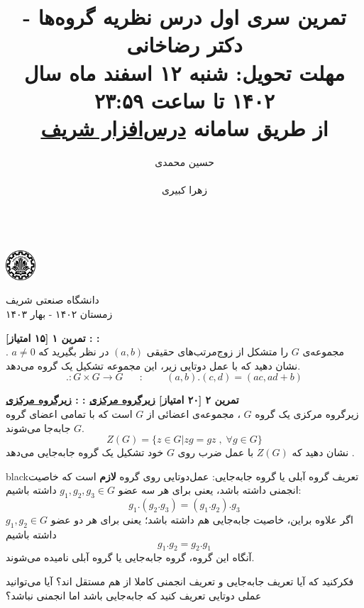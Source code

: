 \documentclass{article}
\title{
	\vspace{-0.8em}
تمرین سری اول درس نظریه گروه‌ها - دکتر رضاخانی
\\
{\normalsize
\textbf{مهلت تحویل:
شنبه ۱۲ اسفند ماه سال ۱۴۰۲ تا ساعت ۲۳:۵۹ 
\\
\vspace{-0.4em}
از طریق سامانه
\href{https://cw.sharif.edu/}{درس‌افزار شریف}
}
}
\vspace{-0.6em}
}
\author{
حسین محمدی\\
  \lr{
  		\href{mailto:hossein.mohammadi.00427@gmail.com}{\texttt{	hossein.mohammadi.00427@gmail.com}}} \\
  \And
  زهرا کبیری\\
 \lr{
  		\href{mailto:kabiri.zahra98@gmail.com}{ \texttt{kabiri.zahra98@gmail.com}}}\\
  }
\newenvironment{exercise}[3][\unskip]{%
	\par
	\noindent
	\textbf{تمرین
		#1
		[#2 امتیاز] 
		\def\temp{#3}\ifx\temp\empty
		: 
		\else
		: #3 \vspace{0.5em} \\ \noindent
		\fi
}}{}
\begin{document}
\begin{minipage}{0.1\textwidth}%
\includegraphics[width=1.1cm]{sharif-logo.png}
\end{minipage}%
\hfill%
\begin{minipage}{0.9\textwidth}\raggedleft
دانشگاه صنعتی شریف\\
زمستان ۱۴۰۲ - بهار ۱۴۰۳\\
\end{minipage}

\makepertitle





\begin{exercise}[۱]{۱۵}{}
	مجموعه‌ی 
	$G$ 
	را متشکل از زوج‌مرتب‌های حقیقی 
	$(a,b)$
	در نظر بگیرید که 
	$a\neq 0$
.
نشان دهید که با عمل دوتایی زیر، این مجموعه تشکیل یک گروه می‌دهد.
\[
. : G \times G \to  G \;\;\;\;\;\;:\;\;\;\;\;\;\;\;
(a,b).(c,d) = (ac,ad+b)
\]
\end{exercise}



\begin{exercise}[۲]{۲۰}{\href{https://en.wikipedia.org/wiki/Central_subgroup}{زیرگروه مرکزی}}
 زیرگروه مرکزی یک گروه 
 $G$
 ، 
 مجموعه‌ی اعضائی از 
 $G$
 است که با تمامی اعضای گروه $G$ جابه‌جا می‌شوند.
 \[
 Z(G) = \{z\in G | zg = gz \;, \; \forall g\in G\}
 \]
 نشان دهید  که 
 $Z(G)$
 با عمل ضرب روی $G$ خود تشکیل یک گروه جابه‌جایی می‌دهد
 .
 \begin{boxes}{black}{تعریف گروه آبلی یا گروه جابه‌جایی:}
 	عمل‌دوتایی روی گروه \textbf{لازم}‌ است که خاصیت انجمنی
 	داشته باشد، یعنی برای هر سه عضو 
 	$g_1 , g_2 , g_3 \in G$
 	داشته باشیم:
 	\[
 	g_1.(g_2.g_3) = (g_1.g_2).g_3
 	\]
 	اگر علاوه بر‌این، خاصیت جابه‌جایی هم داشته باشد؛ یعنی برای هر دو عضو 
 	$g_1 , g_2  \in G$
 	داشته باشیم
 	\[g_1.g_2 = g_2.g_1\]
 	آنگاه این گروه، گروه جابه‌جایی یا گروه آبلی نامیده می‌شوند.
 	
 	فکرکنید که آیا تعریف جابه‌جایی و تعریف انجمنی کاملا از هم مستقل اند؟ آیا می‌توانید عملی دوتایی تعریف کنید که جابه‌جایی باشد اما انجمنی نباشد؟
 	 
 \end{boxes} 
 
\end{exercise}
\end{document}
